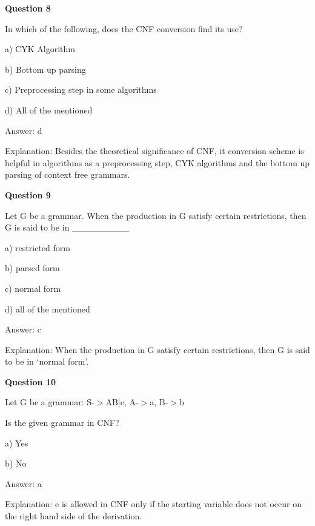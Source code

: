 \documentclass{article}
\begin{document}
\begin{mdframed}[linewidth=1pt, roundcorner=5pt, linecolor=gray!30, backgroundcolor=gray!5]
\textbf{Question 8} 

In which of the following, does the CNF conversion find its use?

a) CYK Algorithm

b) Bottom up parsing

c) Preprocessing step in some algorithms

d) All of the mentioned
\vspace{5pt} \par
\begin{tcolorbox}[colback=green!5, colframe=green!40!black, title=Solution]
Answer: d

Explanation: Besides the theoretical significance of CNF, it conversion scheme is helpful in algorithms as a preprocessing step, CYK algorithms and the bottom up parsing of context free grammars.
\end{tcolorbox}
\end{mdframed}

\begin{mdframed}[linewidth=1pt, roundcorner=5pt, linecolor=gray!30, backgroundcolor=gray!5]
\textbf{Question 9} 

Let G be a grammar. When the production in G satisfy certain restrictions, then G is said to be in \_\_\_\_\_\_\_\_\_

a) restricted form

b) parsed form

c) normal form

d) all of the mentioned
\vspace{5pt} \par
\begin{tcolorbox}[colback=green!5, colframe=green!40!black, title=Solution]
Answer: c

Explanation: When the production in G satisfy certain restrictions, then G is said to be in ‘normal form'.
\end{tcolorbox}
\end{mdframed}
\newpage

\begin{mdframed}[linewidth=1pt, roundcorner=5pt, linecolor=gray!30, backgroundcolor=gray!5]
\textbf{Question 10} 

Let G be a grammar: S-$>$AB|e, A-$>$a, B-$>$b

Is the given grammar in CNF?

a) Yes

b) No
\vspace{5pt} \par
\begin{tcolorbox}[colback=green!5, colframe=green!40!black, title=Solution]
Answer: a

Explanation: e is allowed in CNF only if the starting variable does not occur on the right hand side of the derivation.
\end{tcolorbox}
\end{mdframed}
\newpage
\end{document}
